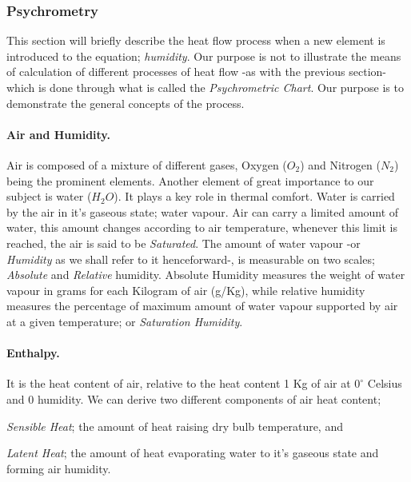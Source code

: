 \subsubsection{Psychrometry}
This section will briefly describe the heat flow process when a new element is introduced to the equation; \emph{humidity}. Our purpose is not to illustrate the means of calculation of different processes of heat flow -as with the previous section- which is done through what is called the \emph{Psychrometric Chart}. Our purpose is to demonstrate the general concepts of the process.
\paragraph{Air and Humidity.} Air is composed of a mixture of different gases, Oxygen ($O_2$) and Nitrogen ($N_2$) being the prominent elements. Another element of great importance to our subject is water ($H_2O$). It plays a key role in thermal comfort. Water is carried by the air in it's gaseous state; water vapour. Air can carry a limited amount of water, this amount changes according to air temperature, whenever this limit is reached, the air is said to be \emph{Saturated}. The amount of water vapour -or \emph{Humidity} as we shall refer to it henceforward-, is measurable on two scales; \emph{Absolute} and \emph{Relative} humidity. Absolute Humidity measures the weight of water vapour in grams for each Kilogram of air (g/Kg), while relative humidity measures the percentage of maximum amount of water vapour supported by air at a given temperature; or \emph{Saturation Humidity}.

\paragraph{Enthalpy.}It is the heat content of air, relative to the heat content 1 Kg of air at $0^\circ$ Celsius and 0 humidity. We can derive two different components of air heat content; 
\begin{inparaenum}
\item \emph{Sensible Heat}; the amount of heat raising dry bulb temperature, and
\item \emph{Latent Heat}; the amount of heat evaporating water to it's gaseous state and forming air humidity.
\end{inparaenum}

